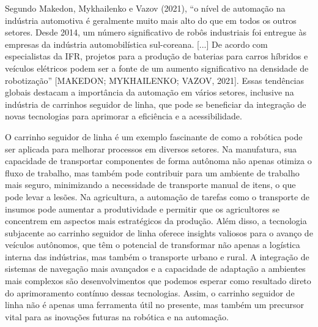 \clearpage

Segundo Makedon, Mykhailenko e Vazov (2021), ``o nível de automação na indústria
automotiva é geralmente muito mais alto do que em todos os outros setores. Desde
2014, um número significativo de robôs industriais foi entregue às empresas da
indústria automobilística sul-coreana. [...] De acordo com especialistas da IFR,
projetos para a produção de baterias para carros híbridos e veículos elétricos
podem ser a fonte de um aumento significativo na densidade de robotização''
[MAKEDON; MYKHAILENKO; VAZOV, 2021]. Essas tendências globais destacam a
importância da automação em vários setores, inclusive na indústria de carrinhos
seguidor de linha, que pode se beneficiar da integração de novas tecnologias
para aprimorar a eficiência e a acessibilidade.

O carrinho seguidor de linha é um exemplo fascinante de como a robótica pode ser
aplicada para melhorar processos em diversos setores. Na manufatura, sua
capacidade de transportar componentes de forma autônoma não apenas otimiza o
fluxo de trabalho, mas também pode contribuir para um ambiente de trabalho mais
seguro, minimizando a necessidade de transporte manual de itens, o que pode
levar a lesões. Na agricultura, a automação de tarefas como o transporte de
insumos pode aumentar a produtividade e permitir que os agricultores se
concentrem em aspectos mais estratégicos da produção. Além disso, a tecnologia
subjacente ao carrinho seguidor de linha oferece insights valiosos para o avanço
de veículos autônomos, que têm o potencial de transformar não apenas a logística
interna das indústrias, mas também o transporte urbano e rural. A integração de
sistemas de navegação mais avançados e a capacidade de adaptação a ambientes
mais complexos são desenvolvimentos que podemos esperar como resultado direto do
aprimoramento contínuo dessas tecnologias. Assim, o carrinho seguidor de linha
não é apenas uma ferramenta útil no presente, mas também um precursor vital para
as inovações futuras na robótica e na automação.
